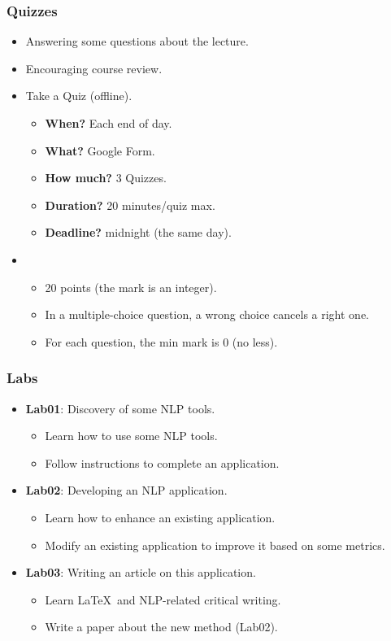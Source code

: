 \documentclass{beamer}
\begin{document}
\begin{frame}
	\frametitle{Quizzes}
	
	\begin{itemize}
		\item Answering some questions about the lecture.
		\item {} Encouraging course review.
		\item {} Take a Quiz (offline).
		\begin{itemize}
			\item \textbf{When?} Each end of day.
			\item \textbf{What?} Google Form.
			\item \textbf{How much?} 3 Quizzes.
			\item \textbf{Duration?} 20 minutes/quiz max.
			\item \textbf{Deadline?} midnight (the same day).
		\end{itemize}
		\item {}
		\begin{itemize}
			\item 20 points (the mark is an integer).
			\item In a multiple-choice question, a wrong choice cancels a right one.
			\item For each question, the min mark is 0 (no less).
		\end{itemize}
	\end{itemize}
	
\end{frame}

\begin{frame}
	\frametitle{Labs}
	
	\begin{itemize}
		\item \textbf{Lab01}: Discovery of some NLP tools.
		\begin{itemize}
			\item {} Learn how to use some NLP tools.
			\item {} Follow instructions to complete an application.
		\end{itemize}
		\item \textbf{Lab02}: Developing an NLP application.
		\begin{itemize}
			\item {} Learn how to enhance an existing application.
			\item {} Modify an existing application to improve it based on some metrics.
		\end{itemize}
		\item \textbf{Lab03}: Writing an article on this application.
		\begin{itemize}
			\item {} Learn \LaTeX\ and NLP-related critical writing.
			\item {} Write a paper about the new method (Lab02).
		\end{itemize}
	\end{itemize}
	
\end{frame}
\end{document}
